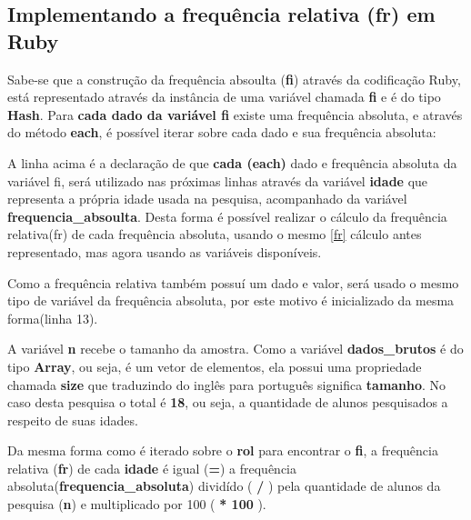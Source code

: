 \documentclass[espaco=simples,appendix=Name]{abnt}
\newcommand{\code}[1] {\textbf{#1}}
\begin{document}



\subsection { Implementando a frequência relativa (fr) em Ruby }

Sabe-se que a construção da frequência absoulta (\code{fi}) através da codificação Ruby, está representado através da instância de uma variável chamada \code{fi} e é do tipo \code{Hash}. Para \textbf{cada dado da variável fi} existe uma frequência absoluta,  e através do método \code{each}, é possível iterar sobre cada dado e sua frequência absoluta:

 

A linha acima é a declaração de que \code{cada (each)} dado e frequência absoluta da variável fi, será utilizado nas próximas linhas através da variável \code{idade} que representa a própria idade usada na pesquisa, acompanhado da variável \code{frequencia\_absoulta}. Desta forma é possível realizar o cálculo da frequência relativa(fr) de cada frequência absoluta, usando o mesmo \ref{fr} cálculo antes representado, mas agora usando as variáveis disponíveis.

 

Como a frequência relativa também possuí um dado e valor, será usado o mesmo tipo de variável da frequência absoluta, por este motivo é inicializado da mesma forma(linha 13).

A variável \code{n} recebe o tamanho da amostra. Como a variável \code{dados\_brutos} é do tipo \code{Array}, ou seja, é um vetor de elementos, ela possui uma propriedade chamada \code{size} que traduzindo do inglês para português significa \code{tamanho}. No caso desta pesquisa o total é \code{18}, ou seja, a quantidade de alunos pesquisados a respeito de suas idades.

Da mesma forma como é iterado sobre o \code{rol} para encontrar o \code{fi}, a frequência relativa (\code{fr}) de cada \code{idade} é igual (\code{=}) a frequência absoluta(\code{frequencia\_absoluta}) dividído ( \code{/} ) pela quantidade de alunos da pesquisa (\code{n}) e multiplicado por 100 (\code{ * 100 }).
\end{document}
